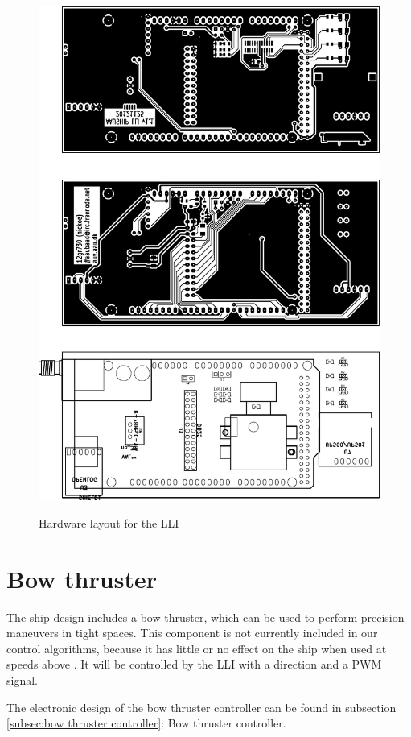 \begin{figure}
\centering
\includegraphics{img/lli-hw}
\label{fig:lli-hw}
\caption{Hardware layout for the LLI}
\end{figure}

\section{Bow thruster}
The ship design includes a bow thruster, which can be used to perform precision maneuvers in tight spaces. This component is not currently included in our control algorithms, because it has little or no effect on the ship when used at speeds above . It will be controlled by the \ac{LLI} with a direction and a \ac{PWM} signal. 

The electronic design of the bow thruster controller can be found in subsection \ref{subsec:bow thruster controller}: Bow thruster controller.
